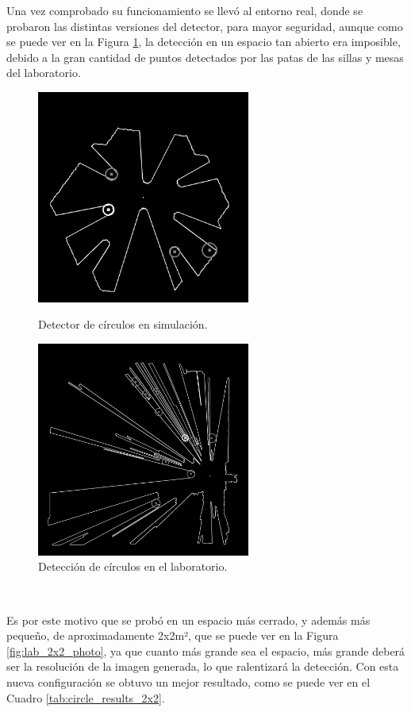 Una vez comprobado su funcionamiento se llevó al entorno real, donde se probaron
las distintas versiones del detector, para mayor seguridad, aunque como se puede
ver en la Figura \ref{fig:circle_detection_lab}, la detección en un espacio tan
abierto era imposible, debido a la gran cantidad de puntos detectados por las
patas de las sillas y mesas del laboratorio.

\begin{figure}[h!]
  \centering
  \begin{minipage}{0.45\textwidth}
    \centering
    \includegraphics[width=7cm]{figs/circle_detection_sim}
    \caption{Detector de círculos en simulación.}
    \label{fig:circle_detection_sim}
  \end{minipage}
  \hfill
  \begin{minipage}{0.45\textwidth}
    \centering
    \includegraphics[width=7cm]{figs/circle_detection_lab}
    \caption{Detección de círculos en el laboratorio.}
    \label{fig:circle_detection_lab}
  \end{minipage}
\end{figure}\

Es por este motivo que se probó en un espacio más cerrado, y además más pequeño,
de aproximadamente 2x2m², que se puede ver en la Figura \ref{fig:lab_2x2_photo},
ya que cuanto más grande sea el espacio, más grande deberá ser la resolución de
la imagen generada, lo que ralentizará la detección.
Con esta nueva configuración se obtuvo un mejor resultado, como se puede ver en
el Cuadro \ref{tab:circle_results_2x2}.

